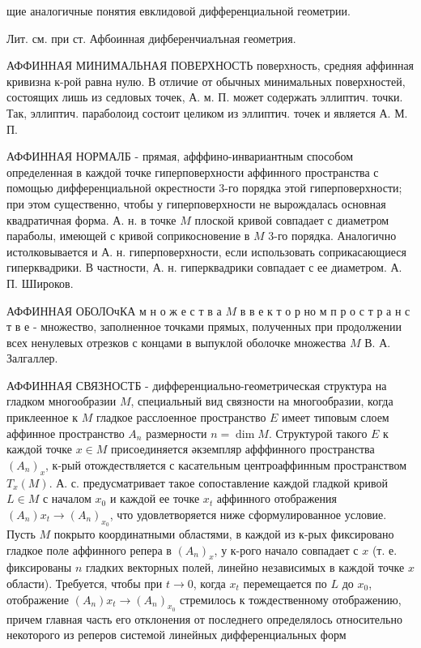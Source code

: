 \documentclass[10pt]{article}
\begin{document}
щие аналогичные понятия евклидовой дифференциальной геометрии.



Лит. см. при ст. Афбоинная дифберенчиалъная геометрия.



АФФИННАЯ МИНИМАЛЬНАЯ ПОВЕРХНОСТЬ поверхность, средняя аффинная кривизна к-рой равна нулю. В отличие от обычных минимальных поверхностей, состоящих лишь из седловых точек, А. м. П. может содержать эллиптич. точки. Так, эллиптич. параболоид состоит целиком из эллиптич. точек и является А. М. П.



АФФИННАЯ НОРМАЛБ - прямая, афффино-инвариантным способом определенная в каждой точке гиперповерхности аффинного пространства с помощью дифференциальной окрестности 3-го порядка этой гиперповерхности; при этом существенно, чтобы у гиперповерхности не вырождалась основная квадратичная форма. А. н. в точке $M$ плоской кривой совпадает с диаметром параболы, имеющей с кривой соприкосновение в $M$ 3-го порядка. Аналогично истолковывается и А. н. гиперповерхности, если использовать соприкасающиеся гиперквадрики. В частности, А. н. гиперквадрики совпадает с ее диаметром. А. П. ШІироков.



АФФИННАЯ ОБОЛОчКА м н о ж е с т в а $M$ в в е к т о р но м п р о с т р а н с т в е - множество, заполненное точками прямых, полученных при продолжении всех ненулевых отрезков с концами в выпуклой оболочке множества $M$ В. А. Залгаллер.



АФФИННАЯ СВЯЗНОСТБ - дифференциально-геометрическая структура на гладком многообразии $M$, специальный вид связности на многообразии, когда приклеенное к $M$ гладкое расслоенное пространство $E$ имеет типовым слоем аффинное пространство $A_{n}$ размерности $n=\operatorname{dim} M$. Структурой такого $E$ к каждой точке $x \in M$ присоединяется әкземпляр афффинного пространства $\left(A_{n}\right)_{x}$, к-рый отождествляется с касательным центроаффинным пространством $T_{x}(M)$. А. с. предусматривает такое сопоставление каждой гладкой кривой $L \in M$ с началом $x_{0}$ и каждой ее точке $x_{t}$ аффинного отображения $\left(A_{n}\right) x_{t} \rightarrow\left(A_{n}\right)_{x_{0}}$, что удовлетворяется ниже сформулированное условие. Пусть $M$ покрыто координатными областями, в каждой из к-рых фиксировано гладкое поле аффинного репера в $\left(A_{n}\right)_{x}$, у к-рого начало совпадает с $x$ (т. е. фиксированы $n$ гладких векторных полей, линейно независимых в каждой точке $x$ области). Требуется, чтобы при $t \rightarrow 0$, когда $x_{t}$ перемещается по $L$ до $x_{0}$, отображение $\left(A_{n}\right) x_{t} \rightarrow\left(A_{n}\right)_{x_{0}}$ стремилось к тождественному отображению, причем главная часть его отклонения от последнего определялось относительно некоторого из реперов системой линейных дифференциальных форм
\end{document}
